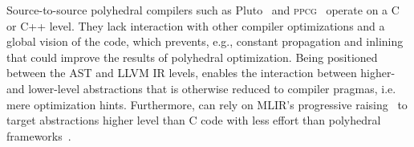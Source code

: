Source-to-source polyhedral compilers such as Pluto~\cite{Bondhugula2008Pluto} and \textsc{ppcg}~\cite{ppcg} operate on a C or C++ level. They lack interaction with other compiler optimizations and a global vision of the code, which prevents, e.g., constant propagation and inlining that could improve the results of polyhedral optimization. Being positioned between the AST and LLVM IR levels, \tool enables the interaction between higher- and lower-level abstractions that is otherwise reduced to compiler pragmas, i.e. mere optimization hints. Furthermore, \tool can rely on MLIR's progressive raising~\cite{mlir_raising} to target abstractions higher level than C code with less effort than polyhedral frameworks~\cite{tactics}.

